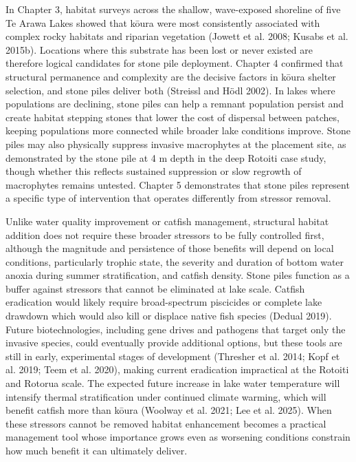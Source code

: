 \documentclass[
  12pt,
  a4paper,
  oneside]{scrbook}
\begin{document}
In Chapter 3, habitat surveys across the shallow, wave-exposed shoreline
of five Te Arawa Lakes showed that kōura were most consistently
associated with complex rocky habitats and riparian vegetation (Jowett
et al. 2008; Kusabs et al. 2015b). Locations where this substrate has
been lost or never existed are therefore logical candidates for stone
pile deployment. Chapter 4 confirmed that structural permanence and
complexity are the decisive factors in kōura shelter selection, and
stone piles deliver both (Streissl and Hödl 2002). In lakes where
populations are declining, stone piles can help a remnant population
persist and create habitat stepping stones that lower the cost of
dispersal between patches, keeping populations more connected while
broader lake conditions improve. Stone piles may also physically
suppress invasive macrophytes at the placement site, as demonstrated by
the stone pile at 4 m depth in the deep Rotoiti case study, though
whether this reflects sustained suppression or slow regrowth of
macrophytes remains untested. Chapter 5 demonstrates that stone piles
represent a specific type of intervention that operates differently from
stressor removal.

Unlike water quality improvement or catfish management, structural
habitat addition does not require these broader stressors to be fully
controlled first, although the magnitude and persistence of those
benefits will depend on local conditions, particularly trophic state,
the severity and duration of bottom water anoxia during summer
stratification, and catfish density. Stone piles function as a buffer
against stressors that cannot be eliminated at lake scale. Catfish
eradication would likely require broad-spectrum piscicides or complete
lake drawdown which would also kill or displace native fish species
(Dedual 2019). Future biotechnologies, including gene drives and
pathogens that target only the invasive species, could eventually
provide additional options, but these tools are still in early,
experimental stages of development (Thresher et al. 2014; Kopf et al.
2019; Teem et al. 2020), making current eradication impractical at the
Rotoiti and Rotorua scale. The expected future increase in lake water
temperature will intensify thermal stratification under continued
climate warming, which will benefit catfish more than kōura (Woolway et
al. 2021; Lee et al. 2025). When these stressors cannot be removed
habitat enhancement becomes a practical management tool whose importance
grows even as worsening conditions constrain how much benefit it can
ultimately deliver.
\end{document}

